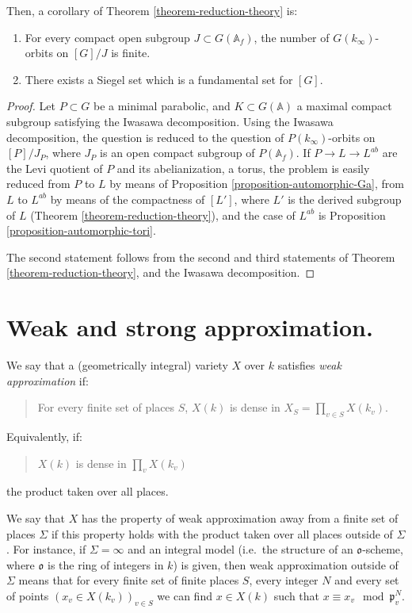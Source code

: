 Then, a corollary of Theorem \ref{theorem-reduction-theory} is:

\begin{theorem}
\label{theorem-Siegel-finiteness}
\begin{enumerate}
 \item For every compact open subgroup $J\subset G(\mathbb A_f)$, the number of $G(k_\infty)$-orbits on $[G]/J$ is finite.
 \item There exists a Siegel set which is a fundamental set for $[G]$.
\end{enumerate}
\end{theorem}

\begin{proof}
Let $P\subset G$ be a minimal parabolic, and $K\subset G(\mathbb A)$ a maximal compact subgroup satisfying the Iwasawa decomposition. Using the Iwasawa decomposition, the question is reduced to the question of $P(k_\infty)$-orbits on $[P]/J_P$, where $J_P$ is an open compact subgroup of $P(\mathbb A_f)$. If $P\to L\to L^{ab}$ are the Levi quotient of $P$ and its abelianization, a torus, the problem is easily reduced from $P$ to $L$ by means of Proposition \ref{proposition-automorphic-Ga}, from $L$ to $L^{ab}$ by means of the compactness of $[L']$, where $L'$ is the derived subgroup of $L$ (Theorem \ref{theorem-reduction-theory}), and the case of $L^{ab}$ is Proposition \ref{proposition-automorphic-tori}.

The second statement follows from the second and third statements of Theorem \ref{theorem-reduction-theory}, and the Iwasawa decomposition.
\end{proof}



\section{Weak and strong approximation.}
\label{section-approximation}


\begin{definition}
 \label{definition-weak-approximation}
We say that a (geometrically integral) variety $X$ over $k$ satisfies {\it weak approximation} if:
\begin{quote}
 For every finite set of places $S$,  $X(k)$ is dense in $X_S=\prod_{v\in S} X(k_v)$.
\end{quote}
Equivalently, if:
\begin{quote}
 $X(k)$ is dense in $\prod_v X(k_v)$
\end{quote}
the product taken over all places. 

We say that $X$ has the property of weak approximation away from a finite set of places $\Sigma$ if this property holds with the product taken over all places outside of $\Sigma$. For instance, if $\Sigma=\infty$ and an integral model (i.e.\ the structure of an $\mathfrak o$-scheme, where $\mathfrak o$ is the ring of integers in $k$) is given, then weak approximation outside of $\Sigma$ means that for every finite set of finite places $S$, every integer $N$ and every set of points $(x_v \in X(k_v))_{v\in S}$ we can find $x\in X(k)$ such that $x\equiv x_v \mod \mathfrak p_v^N$.
\end{definition}

